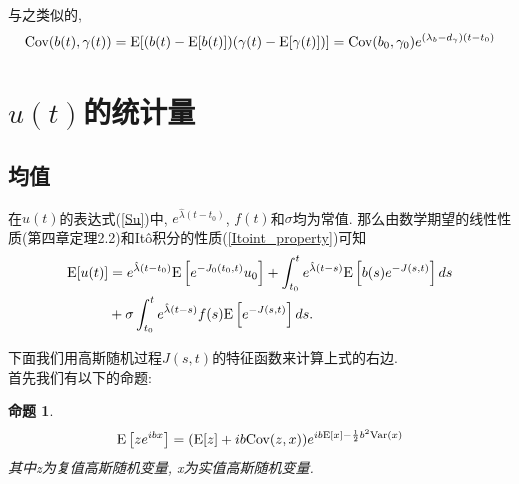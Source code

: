\documentclass[notitlepage,cs4size,punct,oneside]{ctexrep}
\numberwithin{equation}{section}
\theoremstyle{mystyle}
\newtheorem{proposition}[definition]{\hspace{2em}命题}
\begin{document}
与之类似的,
\begin{equation} \label{b_gamma_Cov}
\text{Cov}(b(t), \gamma(t)) = \text{E}[(b(t) - \text{E}[b(t)])(\gamma(t)-\text{E}[\gamma(t)])]
= \text{Cov}(b_0, \gamma_0)e^{(\lambda_b-d_\gamma)(t-t_0)}
\end{equation}

\section{$u(t)$的统计量}
\subsection{均值}
在$u(t)$的表达式(\ref{Su})中, $e^{\hat{\lambda}(t-t_0)}$, $f(t)$和$\sigma$均为常值. 那么由数学期望的线性性质(\cite{shuyuanhe2006probability}第四章定理2.2)和It\^{o}积分的性质(\ref{Itoint_property})可知
\begin{equation} \label{u_stat_1}
\begin{split}
\text{E}[u(t)] &= e^{\hat{\lambda}(t-t_0)}\text{E}\left[e^{-J_0(t_0, t)}u_0\right] + \int_{t_0}^t e^{\hat{\lambda}(t-s)}\text{E}\left[b(s)e^{-J(s, t)}\right]ds  \\
&+ \sigma\int_{t_0}^{t} e^{\hat{\lambda}(t-s)}f(s)\text{E}\left[e^{-J(s, t)}\right]ds.
\end{split}
\end{equation}

下面我们用高斯随机过程$J(s, t)$的特征函数\cite{gershgorin2008nonlinear}\cite{gershgorin2010filtering}来计算上式的右边. \\
首先我们有以下的命题:
\begin{proposition} \label{multiVariable gaussian exp 1}
$$\text{E}\left[ze^{ibx}\right] = (\text{E}[z]+ib\text{Cov}(z, x))e^{ib\text{E}[x]-\frac{1}{2}b^2\text{Var}(x)}$$
其中z为复值高斯随机变量, x为实值高斯随机变量. 
\end{proposition}
\end{document}
